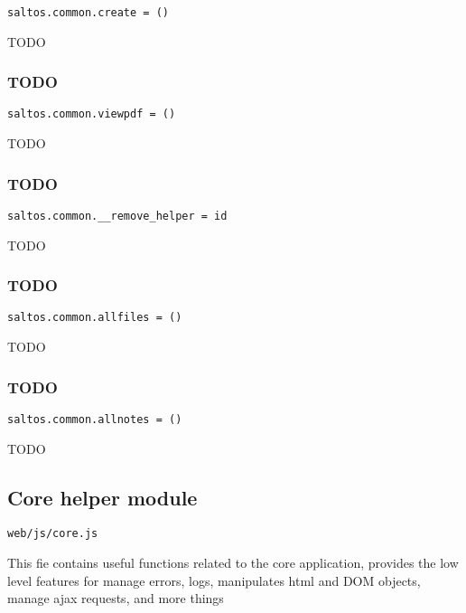 \documentclass[a4paper]{article}
\begin{document}
\begin{lstlisting}
saltos.common.create = ()
\end{lstlisting}

TODO

\hypertarget{toc686}{}
\subsubsection{TODO}

\begin{lstlisting}
saltos.common.viewpdf = ()
\end{lstlisting}

TODO

\hypertarget{toc687}{}
\subsubsection{TODO}

\begin{lstlisting}
saltos.common.__remove_helper = id
\end{lstlisting}

TODO

\hypertarget{toc688}{}
\subsubsection{TODO}

\begin{lstlisting}
saltos.common.allfiles = ()
\end{lstlisting}

TODO

\hypertarget{toc689}{}
\subsubsection{TODO}

\begin{lstlisting}
saltos.common.allnotes = ()
\end{lstlisting}

TODO

\hypertarget{toc690}{}
\subsection{Core helper module}

\begin{lstlisting}
web/js/core.js
\end{lstlisting}

This fie contains useful functions related to the core application, provides the low level features
for manage errors, logs, manipulates html and DOM objects, manage ajax requests, and more things
\end{document}
